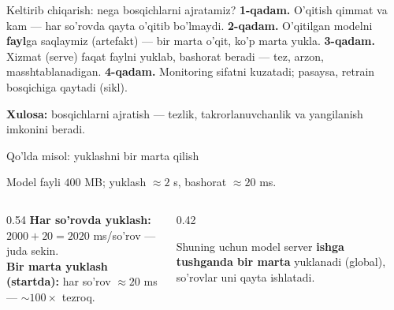 \documentclass[aspectratio=169,11pt]{beamer}
\begin{document}
\begin{frame}{Keltirib chiqarish: nega bosqichlarni ajratamiz?}
  \textbf{1-qadam.} O'qitish qimmat va kam --- har so'rovda qayta o'qitib bo'lmaydi.
  \pause
  \textbf{2-qadam.} O'qitilgan modelni \textbf{fayl}ga saqlaymiz (artefakt) ---
  bir marta o'qit, ko'p marta yukla.
  \pause
  \textbf{3-qadam.} Xizmat (serve) faqat faylni yuklab, bashorat beradi --- tez,
  arzon, masshtablanadigan.
  \pause
  \textbf{4-qadam.} Monitoring sifatni kuzatadi; pasaysa, retrain bosqichiga
  qaytadi (sikl).
  \begin{tcolorbox}[okbox,top=2pt,bottom=2pt]
    \small \textbf{Xulosa:} bosqichlarni ajratish --- tezlik, takrorlanuvchanlik
    va yangilanish imkonini beradi.
  \end{tcolorbox}
\end{frame}

\begin{frame}{Qo'lda misol: yuklashni bir marta qilish}
  \begin{tcolorbox}[defbox,title={Ikki yondashuv}]
    \small Model fayli $400$ MB; yuklash $\approx 2$ s, bashorat $\approx 20$ ms.
  \end{tcolorbox}
  \vspace{0.2em}
  \begin{columns}[T]
    \begin{column}{0.54\textwidth}
      \footnotesize
      \textbf{Har so'rovda yuklash:} $2000 + 20 = 2020$ ms/so'rov --- juda sekin.\\[3pt]
      \textbf{Bir marta yuklash (startda):} har so'rov $\approx 20$ ms ---
      $\sim 100\times$ tezroq.
    \end{column}
    \begin{column}{0.42\textwidth}
      \begin{tcolorbox}[okbox,top=2pt,bottom=2pt]
        \footnotesize
        Shuning uchun model server \textbf{ishga tushganda bir marta} yuklanadi
        (global), so'rovlar uni qayta ishlatadi.
      \end{tcolorbox}
    \end{column}
  \end{columns}
\end{frame}
\end{document}
